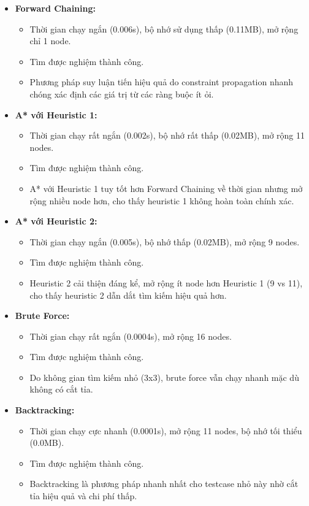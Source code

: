 \begin{itemize}
\item \textbf{Forward Chaining:}
\begin{itemize}
    \item Thời gian chạy ngắn (0.006s), bộ nhớ sử dụng thấp (0.11MB), mở rộng chỉ 1 node.
    \item Tìm được nghiệm thành công.
    \item Phương pháp suy luận tiến hiệu quả do constraint propagation nhanh chóng xác định các giá trị từ các ràng buộc ít ỏi.
\end{itemize}

\item \textbf{A* với Heuristic 1:}
\begin{itemize}
    \item Thời gian chạy rất ngắn (0.002s), bộ nhớ rất thấp (0.02MB), mở rộng 11 nodes.
    \item Tìm được nghiệm thành công.
    \item A* với Heuristic 1 tuy tốt hơn Forward Chaining về thời gian nhưng mở rộng nhiều node hơn, cho thấy heuristic 1 không hoàn toàn chính xác.
\end{itemize}

\item \textbf{A* với Heuristic 2:}
\begin{itemize}
    \item Thời gian chạy ngắn (0.005s), bộ nhớ thấp (0.02MB), mở rộng 9 nodes.
    \item Tìm được nghiệm thành công.
    \item Heuristic 2 cải thiện đáng kể, mở rộng ít node hơn Heuristic 1 (9 vs 11), cho thấy heuristic 2 dẫn dắt tìm kiếm hiệu quả hơn.
\end{itemize}

\item \textbf{Brute Force:}
\begin{itemize}
    \item Thời gian chạy rất ngắn (0.0004s), mở rộng 16 nodes.
    \item Tìm được nghiệm thành công.
    \item Do không gian tìm kiếm nhỏ (3x3), brute force vẫn chạy nhanh mặc dù không có cắt tỉa.
\end{itemize}

\item \textbf{Backtracking:}
\begin{itemize}
    \item Thời gian chạy cực nhanh (0.0001s), mở rộng 11 nodes, bộ nhớ tối thiểu (0.0MB).
    \item Tìm được nghiệm thành công.
    \item Backtracking là phương pháp nhanh nhất cho testcase nhỏ này nhờ cắt tỉa hiệu quả và chi phí thấp.
\end{itemize}

\end{itemize}

